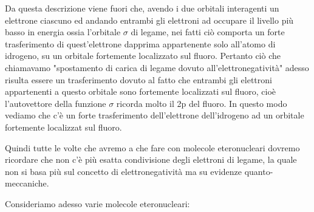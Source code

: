 Da questa descrizione viene fuori che, avendo i due orbitali interagenti un elettrone ciascuno ed andando entrambi gli elettroni ad occupare il livello più basso in energia ossia l'orbitale $\sigma$ di legame, nei fatti ciò comporta un forte trasferimento di quest'elettrone dapprima appartenente solo all'atomo di idrogeno, su un orbitale fortemente localizzato sul fluoro. Pertanto ciò che chiamavamo "spostamento di carica di legame dovuto all'elettronegatività" adesso risulta essere un trasferimento dovuto al fatto che entrambi gli elettroni appartenenti a questo orbitale sono fortemente localizzati sul fluoro, cioè l'autovettore della funzione $\sigma$ ricorda molto il 2p del fluoro. In questo modo vediamo che c'è un forte trasferimento dell'elettrone dell'idrogeno ad un orbitale fortemente localizzat sul fluoro.

Quindi tutte le volte che avremo a che fare con molecole eteronucleari dovremo ricordare che non c'è più esatta condivisione degli elettroni di legame, la quale non si basa più sul concetto di elettronegatività ma su evidenze quanto-meccaniche.

\vspace{0.2cm}Consideriamo adesso varie molecole eteronucleari:

